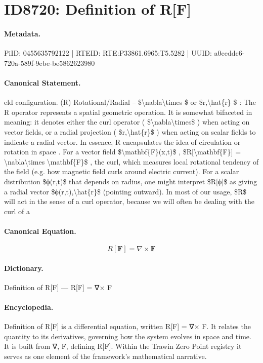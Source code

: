 \section*{ID8720: Definition of R[F]}
\paragraph{Metadata.}
PiID: 0455635792122 | RTEID: RTE:P33861.6965:T5.5282 | UUID: a0ceddc6-720a-589f-9ebe-be5862623980

\paragraph{Canonical Statement.}
eld configuration. (R) Rotational/Radial – \$\textbackslash{}nabla\textbackslash{}times \$ or \$r,\textbackslash{}hat\{r\} \$ : The R operator represents a spatial geometric operation. It is somewhat bifaceted in meaning: it denotes either the curl operator ( \$\textbackslash{}nabla\textbackslash{}times\$ ) when acting on vector fields, or a radial projection ( \$r,\textbackslash{}hat\{r\}\$ ) when acting on scalar fields to indicate a radial vector. In essence, R encapsulates the idea of circulation or rotation in space . For a vector field \$\textbackslash{}mathbf\{F\}(x,t)\$ , \$R[\textbackslash{}mathbf\{F\}] = \textbackslash{}nabla\textbackslash{}times \textbackslash{}mathbf\{F\}\$ , the curl, which measures local rotational tendency of the field (e.g. how magnetic field curls around electric current). For a scalar distribution \$ϕ(r,t)\$ that depends on radius, one might interpret \$R[ϕ]\$ as giving a radial vector \$ϕ(r,t),\textbackslash{}hat\{r\}\$ (pointing outward). In most of our usage, \$R\$ will act in the sense of a curl operator, because we will often be dealing with the curl of a

\paragraph{Canonical Equation.}
\[
R[\mathbf{F}] = \nabla\times \mathbf{F}
\]

\paragraph{Dictionary.}
Definition of R[F] — R[F] = ∇× F

\paragraph{Encyclopedia.}
Definition of R[F] is a differential equation, written R[F] = ∇× F. It relates the quantity to its derivatives, governing how the system evolves in space and time. It is built from ∇, F, defining R[F]. Within the Trawin Zero Point registry it serves as one element of the framework's mathematical narrative.
